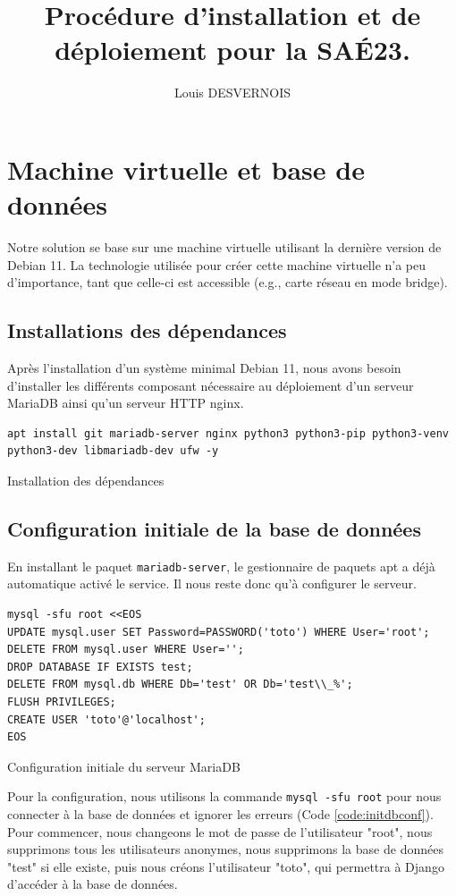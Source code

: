 \documentclass{article}
\author{Louis DESVERNOIS}
\title{Procédure d'installation et de déploiement pour la SAÉ23.}
\begin{document}
\maketitle
\tableofcontents
\listoffigures
\listoflistings
\newpage
\section{Machine virtuelle et base de données}
    Notre solution se base sur une machine virtuelle utilisant la dernière version de Debian 11. La technologie utilisée pour créer cette machine virtuelle n'a peu d'importance, tant que celle-ci est accessible (e.g., carte réseau en mode bridge). 

        \subsection{Installations des dépendances}
        Après l'installation d'un système minimal Debian 11, nous avons besoin d'installer les différents composant nécessaire au déploiement d'un serveur MariaDB ainsi qu'un serveur HTTP nginx.
        \begin{listing}[H]
            \begin{verbatim}
apt install git mariadb-server nginx python3 python3-pip python3-venv python3-dev libmariadb-dev ufw -y
            \end{verbatim}
            \caption{Installation des dépendances}
            \label{code:deps-install}
        \end{listing}

        \subsection{Configuration initiale de la base de données}
        En installant le paquet \verb|mariadb-server|, le gestionnaire de paquets apt a déjà automatique activé le service. Il nous reste donc qu'à configurer le serveur.
        \begin{listing}[H]
            \begin{verbatim}
mysql -sfu root <<EOS
UPDATE mysql.user SET Password=PASSWORD('toto') WHERE User='root';
DELETE FROM mysql.user WHERE User='';
DROP DATABASE IF EXISTS test;
DELETE FROM mysql.db WHERE Db='test' OR Db='test\\_%';
FLUSH PRIVILEGES;
CREATE USER 'toto'@'localhost';
EOS
            \end{verbatim}
            \caption{Configuration initiale du serveur MariaDB}
            \label{code:initdbconf}
        \end{listing}
        Pour la configuration, nous utilisons la commande \verb|mysql -sfu root| pour nous connecter à la base de données et ignorer les erreurs (Code \ref{code:initdbconf}). Pour commencer, nous changeons le mot de passe de l'utilisateur "root", nous supprimons tous les utilisateurs anonymes, nous supprimons la base de données "test" si elle existe, puis nous créons l'utilisateur "toto", qui permettra à Django d'accéder à la base de données.
\end{document}
